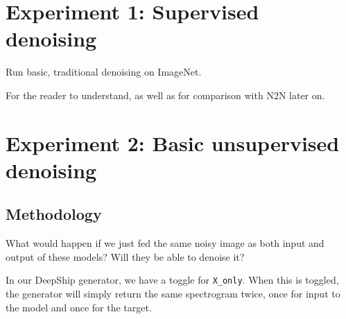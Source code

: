 


\section{Experiment 1: Supervised denoising}

Run basic, traditional denoising on ImageNet.

For the reader to understand, as well as for comparison with N2N later on.

\section{Experiment 2: Basic unsupervised denoising}

\subsection{Methodology}

What would happen if we just fed the same noisy image as both input and output of these models? Will they be able to denoise it?

In our DeepShip generator, we have a toggle for \texttt{X\_only}. When this is toggled, the generator will simply return the same spectrogram twice, once for input to the model and once for the target.

